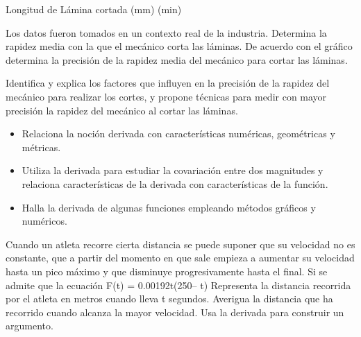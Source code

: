 Longitud de Lámina cortada (mm) (min)


Los datos fueron tomados en un contexto real de la industria. Determina la rapidez media con la que el mecánico corta las láminas. De acuerdo con el gráfico determina la precisión de la rapidez media del mecánico para cortar las láminas.

Identifica y explica los factores que influyen en la precisión de la rapidez del mecánico para realizar los cortes, y propone técnicas para medir con mayor precisión la rapidez del mecánico al cortar las láminas.


\evidencias

\begin{itemize}
  \item Relaciona la noción derivada con características numéricas, geométricas y métricas.
  \item Utiliza la derivada para estudiar la covariación entre dos magnitudes y relaciona características de la derivada con características de la función.
  \item Halla la derivada de algunas funciones empleando métodos gráficos y numéricos.
\end{itemize}

\ejemplo

Cuando un atleta recorre cierta distancia se puede suponer que su velocidad no es constante, que a partir del momento en que sale empieza a aumentar su velocidad hasta un pico máximo y que disminuye progresivamente hasta el final. Si se admite que la ecuación F(t) = 0.00192t(250– t) Representa la distancia recorrida por el atleta en metros cuando lleva t segundos. Averigua la distancia que ha recorrido cuando alcanza la mayor velocidad. Usa la derivada para construir un argumento.


\evidencias


